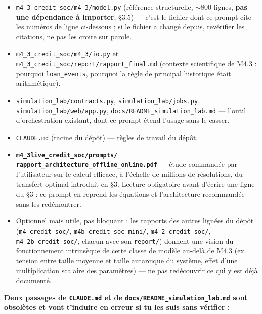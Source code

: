 \documentclass[11pt,a4paper]{article}
\newcommand{\code}[1]{\texttt{#1}}
\begin{document}
\begin{itemize}
\item \code{m4\_3\_credit\_soc/m4\_3/model.py} (référence structurelle,
  $\sim$800 lignes, \textbf{pas une dépendance à importer}, \S3.5) ---
  c'est le fichier dont ce prompt cite les numéros de ligne ci-dessous ;
  si le fichier a changé depuis, revérifier les citations, ne pas les
  croire sur parole.
\item \code{m4\_3\_credit\_soc/m4\_3/io.py} et
  \code{m4\_3\_credit\_soc/report/rapport\_final.md} (contexte
  scientifique de M4.3 : pourquoi \code{loan\_events}, pourquoi la règle
  de principal historique était arithmétique).
\item \code{simulation\_lab/contracts.py}, \code{simulation\_lab/jobs.py},
  \code{simulation\_lab/web/app.py}, \code{docs/README\_simulation\_lab.md}
  --- l'outil d'orchestration existant, dont ce prompt étend l'usage sans
  le casser.
\item \code{CLAUDE.md} (racine du dépôt) --- règles de travail du dépôt.
\item \textbf{\code{m4\_3live\_credit\_soc/prompts/
  rapport\_architecture\_offline\_online.pdf}} --- étude commandée par
  l'utilisateur sur le calcul efficace, à l'échelle de millions de
  résolutions, du transfert optimal introduit en \S3. Lecture obligatoire
  avant d'écrire une ligne du \S3 : ce prompt en reprend les équations et
  l'architecture recommandée sans les redémontrer.
\item Optionnel mais utile, pas bloquant : les rapports des autres
  lignées du dépôt (\code{m4\_credit\_soc/}, \code{m4b\_credit\_soc\_mini/},
  \code{m4\_2\_credit\_soc/}, \code{m4\_2b\_credit\_soc/}, chacun avec son
  \code{report/}) donnent une vision du fonctionnement intrinsèque de
  cette classe de modèle au-delà de M4.3 (ex. tension entre taille
  moyenne et taille autarcique du système, effet d'une multiplication
  scalaire des paramètres) --- ne pas redécouvrir ce qui y est déjà
  documenté.
\end{itemize}

\textbf{Deux passages de \code{CLAUDE.md} et de
\code{docs/README\_simulation\_lab.md} sont obsolètes et vont t'induire en
erreur si tu les suis sans vérifier :}
\end{document}

